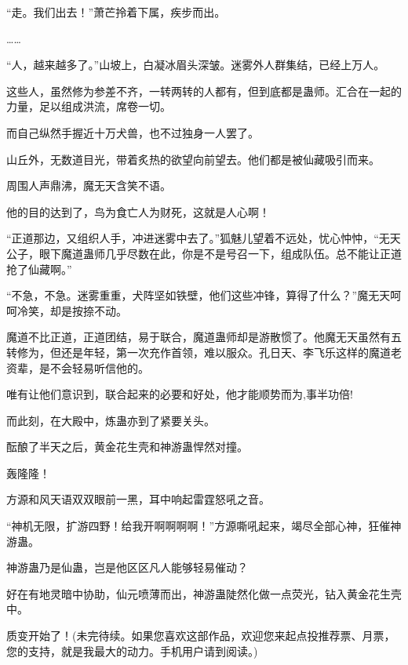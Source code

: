 \begin{this_body}
“走。我们出去！”萧芒拎着下属，疾步而出。

……

“人，越来越多了。”山坡上，白凝冰眉头深皱。迷雾外人群集结，已经上万人。

这些人，虽然修为参差不齐，一转两转的人都有，但到底都是蛊师。汇合在一起的力量，足以组成洪流，席卷一切。

而自己纵然手握近十万犬兽，也不过独身一人罢了。

山丘外，无数道目光，带着炙热的欲望向前望去。他们都是被仙藏吸引而来。

周围人声鼎沸，魔无天含笑不语。

他的目的达到了，鸟为食亡人为财死，这就是人心啊！

“正道那边，又组织人手，冲进迷雾中去了。”狐魅儿望着不远处，忧心忡忡，“无天公子，眼下魔道蛊师几乎尽数在此，你是不是号召一下，组成队伍。总不能让正道抢了仙藏啊。”

“不急，不急。迷雾重重，犬阵坚如铁壁，他们这些冲锋，算得了什么？”魔无天呵呵冷笑，却是按捺不动。

魔道不比正道，正道团结，易于联合，魔道蛊师却是游散惯了。他魔无天虽然有五转修为，但还是年轻，第一次充作首领，难以服众。孔日天、李飞乐这样的魔道老资辈，是不会轻易听信他的。

唯有让他们意识到，联合起来的必要和好处，他才能顺势而为,事半功倍!

而此刻，在大殿中，炼蛊亦到了紧要关头。

酝酿了半天之后，黄金花生壳和神游蛊悍然对撞。

轰隆隆！

方源和风天语双双眼前一黑，耳中响起雷霆怒吼之音。

“神机无限，扩游四野！给我开啊啊啊啊！”方源嘶吼起来，竭尽全部心神，狂催神游蛊。

神游蛊乃是仙蛊，岂是他区区凡人能够轻易催动？

好在有地灵暗中协助，仙元喷薄而出，神游蛊陡然化做一点荧光，钻入黄金花生壳中。

质变开始了！(未完待续。如果您喜欢这部作品，欢迎您来起点投推荐票、月票，您的支持，就是我最大的动力。手机用户请到阅读。)

\end{this_body}

